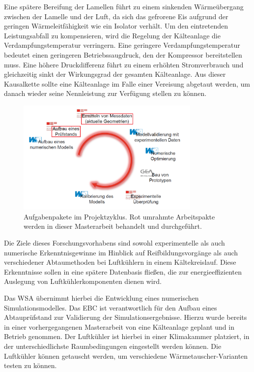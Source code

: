 Eine spätere Bereifung der Lamellen führt zu einem sinkenden Wärmeübergang zwischen der Lamelle und der Luft, da sich das gefrorene Eis aufgrund der geringen Wärmeleitfähigkeit wie ein Isolator verhält. Um den eintretenden Leistungsabfall zu kompensieren, wird die Regelung der Kälteanlage die Verdampfungstemperatur verringern. Eine geringere Verdampfungstemperatur bedeutet einen geringeren Betriebssaugdruck, den der Kompressor bereitstellen muss. Eine höhere Druckdifferenz führt zu einem erhöhten Stromverbrauch und gleichzeitig sinkt der Wirkungsgrad der gesamten Kälteanlage.
Aus dieser Kausalkette sollte eine Kälteanlage im Falle einer Vereisung abgetaut werden, um danach wieder seine Nennleistung zur Verfügung stellen zu können.

 \begin{figure}[htb]
	\centering
		\includegraphics[width=0.80\textwidth]{Pictures/Projektablauf.png}
	\caption{Aufgabenpakete im Projektzyklus.\citep{Freitag2015} Rot umrahmte Arbeitspakte werden in dieser Masterarbeit behandelt und durchgeführt.}
	\label{fig:Aufgabenpakete}
\end{figure}

Die Ziele dieses Forschungsvorhabens sind sowohl experimentelle als auch numerische Erkenntnisgewinne im Hinblick auf Reifbildungsvorgänge als auch verschiedener Abtaumethoden bei Luftkühlern in einem Kältekreislauf. Diese Erkenntnisse sollen in eine spätere Datenbasis fließen, die zur energieeffizienten Auslegung von Luftkühlerkomponenten dienen wird.

Das WSA übernimmt hierbei die Entwicklung eines numerischen Simulationsmodelles. Das EBC ist verantwortlich für den Aufbau eines Abtauprüfstand zur Validierung der Simulationsergebnisse. Hierzu wurde bereits in einer vorhergegangenen Masterarbeit von \citeauthor{Helmlinger2015} eine Kälteanlage geplant und in Betrieb genommen. Der Luftkühler ist hierbei in einer Klimakammer platziert, in der unterschiedlichste Raumbedingungen eingestellt werden können. Die Luftkühler können getauscht werden, um verschiedene Wärmetauscher-Varianten testen zu können.

